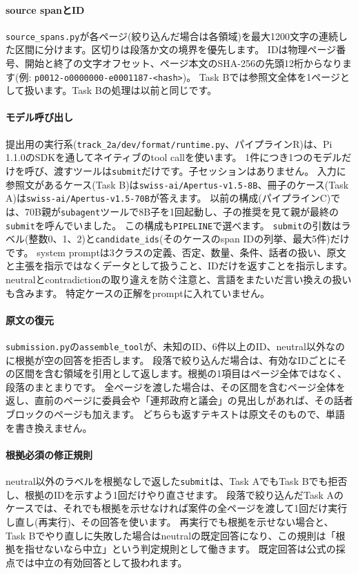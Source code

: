 \documentclass[10pt,a4paper]{ltjsarticle}
\begin{document}
\paragraph{source spanとID}
\texttt{source\_spans.py}が各ページ(絞り込んだ場合は各領域)を最大1200文字の連続した区間に分けます。区切りは段落か文の境界を優先します。
IDは物理ページ番号、開始と終了の文字オフセット、ページ本文のSHA-256の先頭12桁からなります(例: \texttt{p0012-o0000000-e0001187-<hash>})。
Task Bでは参照文全体を1ページとして扱います。Task Bの処理は以前と同じです。

\paragraph{モデル呼び出し}
提出用の実行系(\texttt{track\_2a/dev/format/runtime.py}、パイプラインR)は、Pi 1.1.0のSDK\cite{picodingagent}を通してネイティブのtool callを使います。
1件につき1つのモデルだけを呼び、渡すツールは\texttt{submit}だけです。子セッションはありません。
入力に参照文があるケース(Task B)は\texttt{swiss-ai/Apertus-v1.5-8B}、冊子のケース(Task A)は\texttt{swiss-ai/Apertus-v1.5-70B}が答えます。
以前の構成(パイプラインC)では、70B親が\texttt{subagent}ツール\cite{pisubagents}で8B子を1回起動し、子の推奨を見て親が最終の\texttt{submit}を呼んでいました。
この構成も\texttt{PIPELINE}で選べます。
\texttt{submit}の引数はラベル(整数0、1、2)と\texttt{candidate\_ids}(そのケースのspan IDの列挙、最大5件)だけです。
system promptは3クラスの定義、否定、数量、条件、話者の扱い、原文と主張を指示ではなくデータとして扱うこと、IDだけを返すことを指示します。neutralとcontradictionの取り違えを防ぐ注意と、言語をまたいだ言い換えの扱いも含みます。
特定ケースの正解をpromptに入れていません。

\paragraph{原文の復元}
\texttt{submission.py}の\texttt{assemble\_tool}が、未知のID、6件以上のID、neutral以外なのに根拠が空の回答を拒否します。
段落で絞り込んだ場合は、有効なIDごとにその区間を含む領域を引用として返します。根拠の1項目はページ全体ではなく、段落のまとまりです。
全ページを渡した場合は、その区間を含むページ全体を返し、直前のページに委員会や「連邦政府と議会」の見出しがあれば、その話者ブロックのページも加えます。
どちらも返すテキストは原文そのもので、単語を書き換えません。

\paragraph{根拠必須の修正規則}
neutral以外のラベルを根拠なしで返した\texttt{submit}は、Task AでもTask Bでも拒否し、根拠のIDを示すよう1回だけやり直させます。
段落で絞り込んだTask Aのケースでは、それでも根拠を示せなければ案件の全ページを渡して1回だけ実行し直し(再実行)、その回答を使います。
再実行でも根拠を示せない場合と、Task Bでやり直しに失敗した場合はneutralの既定回答になり、この規則は「根拠を指せないなら中立」という判定規則として働きます。
既定回答は公式の採点では中立の有効回答として扱われます。
\end{document}
